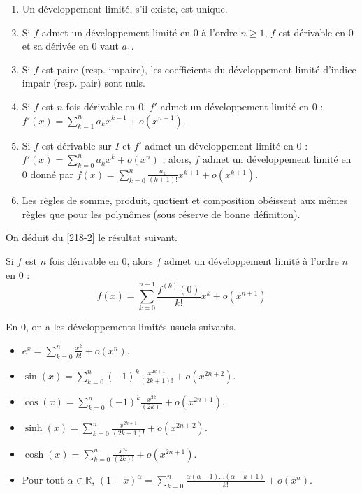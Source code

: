   \begin{proposition}
    \begin{enumerate}[label=(\roman*)]
      \item Un développement limité, s'il existe, est unique.
      \item Si $f$ admet un développement limité en $0$ à l'ordre $n \geq 1$, $f$ est dérivable en $0$ et sa dérivée en $0$ vaut $a_1$.
      \item Si $f$ est paire (resp. impaire), les coefficients du développement limité d'indice impair (resp. pair) sont nuls.
      \item Si $f$ est $n$ fois dérivable en $0$, $f'$ admet un développement limité en $0$ : $f'(x) = \sum_{k=1}^{n} a_k x^{k-1} + o(x^{n-1})$.
      \item Si $f$ est dérivable sur $I$ et $f'$ admet un développement limité en $0$ : $f'(x) = \sum_{k=0}^{n} a_k x^k + o(x^n)$ ; alors, $f$ admet un développement limité en $0$ donné par $f(x) = \sum_{k=0}^{n} \frac{a_k}{(k+1)!} x^{k+1} + o(x^{k+1})$.
      \item Les règles de somme, produit, quotient et composition obéissent aux mêmes règles que pour les polynômes (sous réserve de bonne définition).
    \end{enumerate}
  \end{proposition}

  On déduit du \cref{218-2} le résultat suivant.

  \begin{proposition}
    Si $f$ est $n$ fois dérivable en $0$, alors $f$ admet un développement limité à l'ordre $n$ en $0$ :
    \[ f(x) = \sum_{k=0}^{n+1} \frac{f^{(k)} (0)}{k!} x^k + o(x^{n+1}) \]
  \end{proposition}

  \begin{example}
    En $0$, on a les développements limités usuels suivants.
    \begin{itemize}
      \item $e^x = \sum_{k=0}^{n} \frac{x^k}{k!} + o(x^n)$.
      \item $\sin(x) = \sum_{k=0}^{n} (-1)^{k} \frac{x^{2k+1}}{(2k+1)!} + o(x^{2n+2})$.
      \item $\cos(x) = \sum_{k=0}^{n} (-1)^{k} \frac{x^{2k}}{(2k)!} + o(x^{2n+1})$.
      \item $\sinh(x) = \sum_{k=0}^{n} \frac{x^{2k+1}}{(2k+1)!} + o(x^{2n+2})$.
      \item $\cosh(x) = \sum_{k=0}^{n} \frac{x^{2k}}{(2k)!} + o(x^{2n+1})$.
      \item Pour tout $\alpha \in \mathbb{R}$, $(1+x)^\alpha = \sum_{k=0}^n \frac{\alpha(\alpha - 1) \dots (\alpha -k+1)}{k!} + o(x^n)$.
    \end{itemize}
  \end{example}

